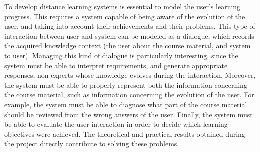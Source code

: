 To develop distance learning systems is essential to model the user's learning
progress. This requires a system capable of being aware of the evolution of the
user, and taking into account their achievements and their problems. This type
of interaction between user and system can be modeled as a dialogue, which
records the acquired knowledge context (the user about the course material, and
system to user). Managing this kind of dialogue is particularly interesting,
since the system must be able to interpret requirements, and generate
appropriate responses, non-experts whose knowledge evolves during the
interaction. Moreover, the system must be able to properly represent both the
information concerning the course material, such as information concerning the
evolution of the user. For example, the system must be able to diagnose what
part of the course material should be reviewed from the wrong answers of the
user. Finally, the system must be able to evaluate the user interaction in order
to decide which learning objectives were achieved. The theoretical and practical
results obtained during the project directly contribute to solving these
problems.




